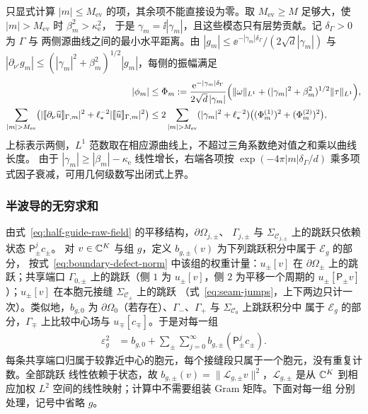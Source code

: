 \begin{workonly}
只显式计算 $|m|\leq M_{\mathrm{ev}}$ 的项，其余项不能直接设为零。取
$M_{\mathrm{ev}}\geq M$ 足够大，使 $|m|>M_{\mathrm{ev}}$ 时 $\beta_m^2>\kappa_{\mathrm e}^2$，
于是 $\gamma_m=\ii|\gamma_m|$，且这些模态只有层势贡献。记 $\delta_\Gamma>0$ 为 $\Gamma$ 与
两侧源曲线之间的最小水平距离。由 $|g_m|\leq\ee^{-|\gamma_m|\delta_\Gamma}/(2\sqrt d|\gamma_m|)$
与 $|\partial_{\nu'}g_m|\leq(|\gamma_m|^2+\beta_m^2)^{1/2}|g_m|$，每侧的振幅满足
\begin{align}
  |\phi_m|
  &\leq\Phi_m
  :=\frac{\ee^{-|\gamma_m|\delta_\Gamma}}{2\sqrt d\,|\gamma_m|}
  \Bigl(\lVert\omega\rVert_{L^1}+(|\gamma_m|^2+\beta_m^2)^{1/2}\lVert\tau\rVert_{L^1}\Bigr),
  \notag\\
  \sum_{|m|>M_{\mathrm{ev}}}
  \bigl(|\jump{\partial_\nu\widehat u}_{\Gamma,m}|^2+\ell_*^{-2}|\jump{\widehat u}_{\Gamma,m}|^2\bigr)
  &\leq2\sum_{|m|>M_{\mathrm{ev}}}(|\gamma_m|^2+\ell_*^{-2})
  \bigl((\Phi_m^{(1)})^2+(\Phi_m^{(2)})^2\bigr),
  \label{eq:artificial-tail-bound}
\end{align}
上标表示两侧，$L^1$ 范数取在相应源曲线上，不超过三角系数绝对值之和乘以曲线长度。
由于 $|\gamma_m|\geq|\beta_m|-\kappa_{\mathrm e}$ 线性增长，右端各项按
$\exp(-4\pi|m|\delta_\Gamma/d)$ 乘多项式因子衰减，可用几何级数写出闭式上界。
\end{workonly}

\subsubsection{半波导的无穷求和}

由式~\eqref{eq:half-guide-raw-field} 的平移结构，$\partial\Omega_{j,\pm}$、
$\Gamma_{j,\pm}$ 与 $\Sigma_{\mathcal C_{j,\pm}}$ 上的跳跃只依赖状态 $\mathsf P_\pm^jc_\pm$。
对 $v\in\mathbb{C}^K$ 与组 $g$，定义 $b_{g,\pm}(v)$ 为下列跳跃积分中属于 $\mathscr E_g$ 的部分，
按式~\eqref{eq:boundary-defect-norm} 中该组的权重计量：$u_\pm[v]$ 在 $\partial\Omega_\pm$
上的跳跃；共享端口 $\Gamma_{0,\pm}$ 上的跳跃（侧 $1$ 为 $u_\pm[v]$，侧 $2$ 为平移一个周期的
$u_\pm[\mathsf P_\pm v]$）；$u_\pm[v]$ 在本胞元接缝 $\Sigma_{\mathcal C_\pm}$ 上的跳跃
（式~\eqref{eq:seam-jumps}，上下两边只计一次）。类似地，$b_{g,0}$ 为
$\partial\Omega_0$（若存在）、$\Gamma_-$、$\Gamma_+$ 与 $\Sigma_{\mathcal C_0}$ 上跳跃积分中
属于 $\mathscr E_g$ 的部分，$\Gamma_\mp$ 上比较中心场与 $u_\mp[c_\mp]$。于是对每一组
\begin{align}
  \varepsilon_g^2
  &=b_{g,0}+\sum_{\pm}\sum_{j=0}^{\infty}b_{g,\pm}(\mathsf P_\pm^jc_\pm).
  \label{eq:full-propagation-boundary-sum}
\end{align}
每条共享端口归属于较靠近中心的胞元，每个接缝段只属于一个胞元，没有重复计数。全部跳跃
线性依赖于状态，故 $b_{g,\pm}(v)=\lVert\mathcal L_{g,\pm}v\rVert^2$，$\mathcal L_{g,\pm}$
是从 $\mathbb{C}^K$ 到相应加权 $L^2$ 空间的线性映射；计算中不需要组装 Gram 矩阵。下面对每一组
分别处理，记号中省略 $g$。


